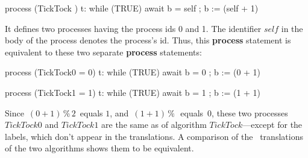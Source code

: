 \documentclass[fleqn,leqno]{article}
\begin{document}
\begin{display}
\begin{nopcal}
process (TickTock ) 
      { t: while (TRUE)
              { await b = self ;
                b := (self + 1)  %
              }
      }
\end{nopcal}
\begin{tlatex}
%
%
%
%
\end{tlatex}
\end{display}
It defines two processes having the process ids 0 and 1.  The identifier
$self$ in the body of the process denotes the process's id.  Thus,
this \textbf{process} statement is equivalent to these two separate
\textbf{process} statements:
\begin{display}
\begin{twocols}[.4]
\begin{nopcal}
process (TickTock0 = 0) 
      { t: while (TRUE)
              { await b = 0 ;
                b := (0 + 1)  %
              }
      }
\end{nopcal}
\begin{tlatex}
%
%
%
%
\end{tlatex}
\midcol
\begin{nopcal}
process (TickTock1 = 1) 
      { t: while (TRUE)
              { await b = 1 ;
                b := (1 + 1)  %
              }
      }
\end{nopcal}
\begin{tlatex}
%
%
%
%
%
\end{tlatex}
\end{twocols}
\end{display}
Since \,$(0+1)\,\%\,2$\, equals $1$, and \,$(1+1)\,\%\,$\, equals~0,
these two processes $TickTock0$ and $TickTock1$ are the same as
 of algorithm
$TickTock$---except for the labels, which don't appear in the
translations.  A comparison of the \tlaplus\ translations of the two
algorithms shows them to be equivalent.
 
\end{document}
